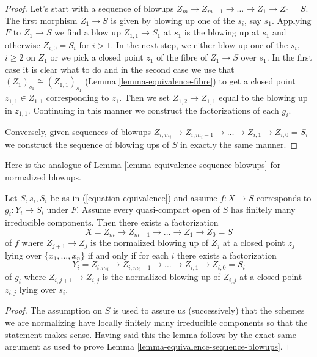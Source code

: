 \begin{proof}
Let's start with a sequence of blowups
$Z_m \to Z_{m - 1} \to \ldots \to Z_1 \to Z_0 = S$.
The first morphism $Z_1 \to S$ is given
by blowing up one of the $s_i$, say $s_1$. Applying $F$
to $Z_1 \to S$ we find a blow up $Z_{1, 1} \to S_1$ at $s_1$
is the blowing up at $s_1$ and otherwise $Z_{i, 0} = S_i$ for $i > 1$.
In the next step, we either blow up one of the $s_i$, $i \geq 2$
on $Z_1$ or we pick a closed point $z_1$ of the fibre of $Z_1 \to S$
over $s_1$. In the first case it is clear what to do and in
the second case we use that $(Z_1)_{s_1} \cong (Z_{1, 1})_{s_1}$
(Lemma \ref{lemma-equivalence-fibre})
to get a closed point $z_{1, 1} \in Z_{1, 1}$ corresponding to $z_1$.
Then we set $Z_{1, 2} \to Z_{1, 1}$ equal to the blowing up
in $z_{1, 1}$. Continuing in this manner we construct the factorizations
of each $g_i$.

\medskip\noindent
Conversely, given sequences of blowups
$Z_{i, m_i} \to Z_{i, m_i - 1} \to \ldots \to Z_{i, 1} \to Z_{i, 0} = S_i$
we construct the sequence of blowing ups of $S$ in exactly the same manner.
\end{proof}

\noindent
Here is the analogue of
Lemma \ref{lemma-equivalence-sequence-blowups}
for normalized blowups.

\begin{lemma}
\label{lemma-equivalence-sequence-normalized-blowups}
Let $S, s_i, S_i$ be as in (\ref{equation-equivalence})
and assume $f : X \to S$ corresponds to $g_i : Y_i \to S_i$ under $F$.
Assume every quasi-compact open of $S$ has finitely many irreducible
components.  Then there exists a factorization
$$
X = Z_m \to Z_{m - 1} \to \ldots \to Z_1 \to Z_0 = S
$$
of $f$ where $Z_{j + 1} \to Z_j$ is the normalized blowing up of $Z_j$
at a closed point $z_j$ lying over $\{x_1, \ldots, x_n\}$ if and only if
for each $i$ there exists a factorization
$$
Y_i = Z_{i, m_i} \to Z_{i, m_i - 1} \to \ldots \to Z_{i, 1} \to Z_{i, 0} = S_i
$$
of $g_i$ where $Z_{i, j + 1} \to Z_{i, j}$ is the normalized blowing up of
$Z_{i, j}$ at a closed point $z_{i, j}$ lying over $s_i$.
\end{lemma}

\begin{proof}
The assumption on $S$ is used to assure us (successively) that
the schemes we are normalizing have locally finitely many irreducible
components so that the statement makes sense. Having said this the
lemma follows by the exact same argument as used to prove
Lemma \ref{lemma-equivalence-sequence-blowups}.
\end{proof}








